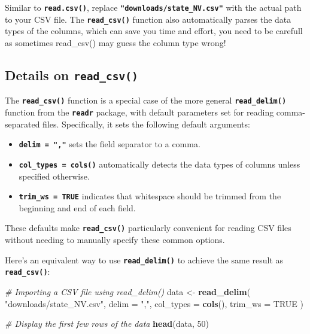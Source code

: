 \documentclass[
]{book}
\newenvironment{Shaded}{\begin{snugshade}}{\end{snugshade}}
\newcommand{\AttributeTok}[1]{\textcolor[rgb]{0.13,0.29,0.53}{#1}}
\newcommand{\CommentTok}[1]{\textcolor[rgb]{0.56,0.35,0.01}{\textit{#1}}}
\newcommand{\ConstantTok}[1]{\textcolor[rgb]{0.56,0.35,0.01}{#1}}
\newcommand{\DecValTok}[1]{\textcolor[rgb]{0.00,0.00,0.81}{#1}}
\newcommand{\FunctionTok}[1]{\textcolor[rgb]{0.13,0.29,0.53}{\textbf{#1}}}
\newcommand{\NormalTok}[1]{#1}
\newcommand{\OtherTok}[1]{\textcolor[rgb]{0.56,0.35,0.01}{#1}}
\newcommand{\StringTok}[1]{\textcolor[rgb]{0.31,0.60,0.02}{#1}}
\providecommand{\tightlist}{%
  \setlength{\itemsep}{0pt}\setlength{\parskip}{0pt}}
\begin{document}
Similar to \textbf{\texttt{read.csv()}}, replace \textbf{\texttt{"downloads/state\_NV.csv"}} with the actual path to your CSV file. The \textbf{\texttt{read\_csv()}} function also automatically parses the data types of the columns, which can save you time and effort, {you need to be carefull as sometimes read\_csv() may guess the column type wrong!}

\hypertarget{details-on-read_csv}{%
\subsection*{\texorpdfstring{Details on \texttt{read\_csv()}}{Details on read\_csv()}}\label{details-on-read_csv}}

The \textbf{\texttt{read\_csv()}} function is a special case of the more general \textbf{\texttt{read\_delim()}} function from the \textbf{\texttt{readr}} package, with default parameters set for reading comma-separated files. Specifically, it sets the following default arguments:

\begin{itemize}
\tightlist
\item
  \textbf{\texttt{delim\ =\ ","}} sets the field separator to a comma.
\item
  \textbf{\texttt{col\_types\ =\ cols()}} automatically detects the data types of columns unless specified otherwise.
\item
  \textbf{\texttt{trim\_ws\ =\ TRUE}} indicates that whitespace should be trimmed from the beginning and end of each field.
\end{itemize}

These defaults make \textbf{\texttt{read\_csv()}} particularly convenient for reading CSV files without needing to manually specify these common options.

Here's an equivalent way to use \textbf{\texttt{read\_delim()}} to achieve the same result as \textbf{\texttt{read\_csv()}}:

\begin{Shaded}
\begin{Highlighting}[]
\CommentTok{\# Importing a CSV file using read\_delim()}
\NormalTok{data }\OtherTok{\textless{}{-}} \FunctionTok{read\_delim}\NormalTok{(}
  \StringTok{"downloads/state\_NV.csv"}\NormalTok{,}
  \AttributeTok{delim =} \StringTok{","}\NormalTok{,}
  \AttributeTok{col\_types =} \FunctionTok{cols}\NormalTok{(),}
  \AttributeTok{trim\_ws =} \ConstantTok{TRUE}
\NormalTok{)}

\CommentTok{\# Display the first few rows of the data}
\FunctionTok{head}\NormalTok{(data, }\DecValTok{50}\NormalTok{)}
\end{Highlighting}
\end{Shaded}
\end{document}
